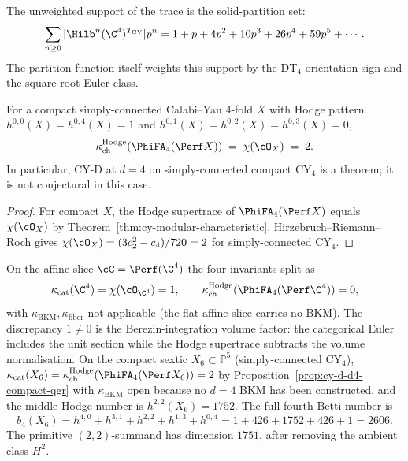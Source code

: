 \begin{example}
\label{ex:Z-m4-expansion}
The unweighted support of the trace is the solid-partition set:
\[
 \sum_{n\geq0}|\Hilb^n(\C^4)^{T_{\mathrm{CY}}}|p^n
 = 1 + p + 4p^2 + 10p^3 + 26p^4 + 59p^5 + \cdots.
\]
The partition function itself weights this support by the DT$_4$
orientation sign and the square-root Euler class.
\end{example}

\begin{proposition}[CY-D at \texorpdfstring{$d = 4$}{d=4} on compact CY$_4$]
\label{prop:cy-d-d4-compact-qgr}
For a compact simply-connected Calabi--Yau $4$-fold $X$ with
Hodge pattern $h^{0,0}(X) = h^{0,4}(X) = 1$ and
$h^{0,1}(X) = h^{0,2}(X) = h^{0,3}(X) = 0$,
\[
 \kappa_{\mathrm{ch}}^{\mathrm{Hodge}}(\PhiFA_4(\Perf X)) \;=\; \chi(\cO_X) \;=\; 2.
\]
In particular, CY-D at $d = 4$ on simply-connected compact CY$_4$ is a
theorem; it is not conjectural in this case.
\end{proposition}

\begin{proof}
For compact $X$, the Hodge supertrace of $\PhiFA_4(\Perf X)$ equals
$\chi(\cO_X)$ by Theorem~\ref{thm:cy-modular-characteristic}.
Hirzebruch--Riemann--Roch gives
$\chi(\cO_X) = (3 c_2^2 - c_4)/720 = 2$ for simply-connected
CY$_4$.
\end{proof}

\begin{remark}
\label{rem:four-kappa-d4-split}
On the affine slice $\cC = \Perf(\C^4)$ the four invariants split as
\[
 \kappa_{\mathrm{cat}}(\C^4) = \chi(\cO_{\C^4}) = 1, \qquad
 \kappa_{\mathrm{ch}}^{\mathrm{Hodge}}(\PhiFA_4(\Perf \C^4)) = 0,
\]
with $\kappa_{\mathrm{BKM}}, \kappa_{\mathrm{fiber}}$ not applicable
(the flat affine slice carries no BKM). The discrepancy
$1 \neq 0$ is the Berezin-integration volume factor: the categorical
Euler includes the unit section while the Hodge supertrace subtracts
the volume normalisation. On the compact sextic $X_6 \subset \mathbb{P}^5$
(simply-connected CY$_4$),
$\kappa_{\mathrm{cat}}(X_6) = \kappa_{\mathrm{ch}}^{\mathrm{Hodge}}(\PhiFA_4(\Perf X_6)) = 2$
by Proposition~\ref{prop:cy-d-d4-compact-qgr} with
$\kappa_{\mathrm{BKM}}$ open because no $d = 4$ BKM has been
constructed, and the middle Hodge number is \(h^{2,2}(X_6)=1752\). The full fourth Betti number is
\[
b_4(X_6)=h^{4,0}+h^{3,1}+h^{2,2}+h^{1,3}+h^{0,4}
=1+426+1752+426+1=2606.
\]
The primitive \((2,2)\)-summand has dimension \(1751\), after removing the ambient class \(H^2\).
\end{remark}

